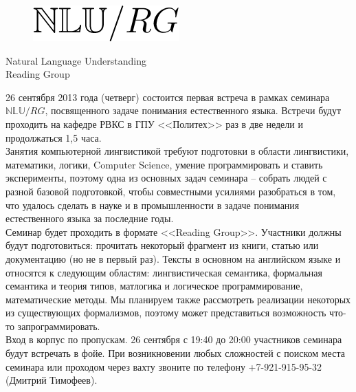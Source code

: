 \documentclass[12pt]{article}
\begin{document}
\baselineskip 24pt

\parindent 0cm

\begin{figure}
  \begin{center}
    \includegraphics[scale=0.70]{nlu-rg-logo.png}
  \end{center}
\end{figure}

\begin{center}
{\rm \Huge{Natural Language Understanding}}\\
\bigskip
{\rm \Large Reading Group}
\end{center}

\bigskip
\bigskip

\baselineskip 15pt

26 сентября 2013 года (четверг) состоится первая встреча в рамках семинара $\mathbb{NLU}/RG$, посвященного задаче понимания естественного языка. Встречи будут проходить на кафедре РВКС в ГПУ <<Политех>> раз в две недели и продолжаться 1,5 часа.\\

Занятия компьютерной лингвистикой требуют подготовки в области лингвистики, математики, логики, Computer Science, умение программировать и ставить эксперименты, поэтому одна из основных задач семинара -- собрать людей с разной базовой подготовкой, чтобы совместными усилиями разобраться в том, что удалось сделать в науке и в промышленности в задаче понимания естественного языка за последние годы.\\

Семинар будет проходить в формате <<Reading Group>>. Участники должны будут подготовиться: прочитать некоторый фрагмент из книги, статью или документацию (но не в первый раз). Тексты в основном на английском языке и относятся к следующим областям: лингвистическая семантика, формальная семантика и теория типов, матлогика и логическое программирование, математические методы. Мы планируем также рассмотреть реализации некоторых из существующих формализмов, поэтому может представиться возможность что-то запрограммировать.\\

Вход в корпус по пропускам. 26 сентября с 19:40 до 20:00 участников семинара будут встречать в фойе. При возникновении любых сложностей с поиском места семинара или проходом через вахту звоните по телефону +7-921-915-95-32 (Дмитрий Тимофеев).\\
\end{document}
